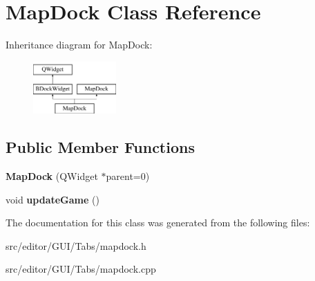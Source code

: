 \hypertarget{class_map_dock}{\section{\-Map\-Dock \-Class \-Reference}
\label{class_map_dock}
}
\-Inheritance diagram for \-Map\-Dock\-:\begin{figure}[H]
\begin{center}
\leavevmode
\includegraphics[height=2.000000cm]{class_map_dock}
\end{center}
\end{figure}
\subsection*{\-Public \-Member \-Functions}
\begin{DoxyCompactItemize}
\item 
\hypertarget{class_map_dock_ae65c5f2f8531ec69a9289c8d4731226e}{{\bfseries \-Map\-Dock} (\-Q\-Widget $\ast$parent=0)}\label{class_map_dock_ae65c5f2f8531ec69a9289c8d4731226e}

\item 
\hypertarget{class_map_dock_a4913eb300e5dd170e9b6c16799731db3}{void {\bfseries update\-Game} ()}\label{class_map_dock_a4913eb300e5dd170e9b6c16799731db3}

\end{DoxyCompactItemize}


\-The documentation for this class was generated from the following files\-:\begin{DoxyCompactItemize}
\item 
src/editor/\-G\-U\-I/\-Tabs/mapdock.\-h\item 
src/editor/\-G\-U\-I/\-Tabs/mapdock.\-cpp\end{DoxyCompactItemize}
